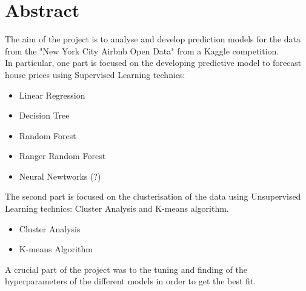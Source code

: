 \documentclass{FR16}
\begin{document}
\maketitle

\newpage
\tableofcontents
\newpage
\section{Abstract}
The aim of the project is to analyse and develop prediction models for the data from the "New York City Airbnb Open Data" from a Kaggle competition.
\\ In particular, one part is focused on the developing predictive model to forecast house prices using Supervised Learning technics:\begin{itemize}
\itemsep0em 
\item Linear Regression
\item Decision Tree
\item Random Forest
\item Ranger Random Forest
\item Neural Newtworks (?)
\end{itemize}
The second part is focused on the clusterisation of the data using Unsupervised Learning technics: Cluster Analysis and K-means algorithm.
\begin{itemize}
\itemsep0em
\item Cluster Analysis
\item K-means Algorithm
\end{itemize}
A crucial part of the project was to the tuning and finding of the hyperparameters of the different models in order to get the best fit.
\end{document}

